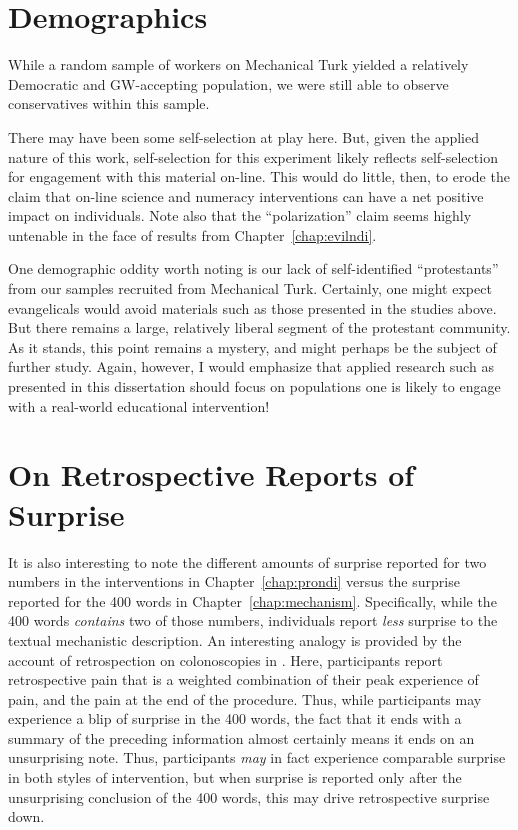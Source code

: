 \section{Demographics}

While a random sample of workers on Mechanical Turk yielded a relatively
Democratic and GW-accepting population, we were still able to observe
conservatives within this sample.

There may have been some self-selection at play here. But, given the applied
nature of this work, self-selection for this experiment likely reflects
self-selection for engagement with this material on-line. This would do little,
then, to erode the claim that on-line science and numeracy interventions can
have a net positive impact on individuals. Note also that the “polarization”
claim seems highly untenable in the face of results from
Chapter~\ref{chap:evilndi}.

One demographic oddity worth noting is our lack of self-identified “protestants”
from our samples recruited from Mechanical Turk. Certainly, one might expect
evangelicals would avoid materials such as those presented in the studies above.
But there remains a large, relatively liberal segment of the protestant
community. As it stands, this point remains a mystery, and might perhaps be the
subject of further study. Again, however, I would emphasize that applied
research such as presented in this dissertation should focus on populations one
is likely to engage with a real-world educational intervention!

\section{On Retrospective Reports of Surprise}

It is also interesting to note the different amounts of surprise reported for
two numbers in the interventions in Chapter~\ref{chap:prondi} versus the
surprise reported for the 400 words in Chapter~\ref{chap:mechanism}.
Specifically, while the 400 words \emph{contains} two of those numbers,
individuals report \emph{less} surprise to the textual mechanistic description.
An interesting analogy is provided by the account of retrospection on
colonoscopies in \textcite{kahneman_perspective_2003}. Here, participants report
retrospective pain that is a weighted combination of their peak experience of
pain, and the pain at the end of the procedure. Thus, while participants may
experience a blip of surprise in the 400 words, the fact that it ends with a
summary of the preceding information almost certainly means it ends on an
unsurprising note.  Thus, participants \emph{may} in fact experience comparable surprise
in both styles of intervention, but when surprise is reported only after the
unsurprising conclusion of the 400 words, this may drive retrospective surprise
down.


